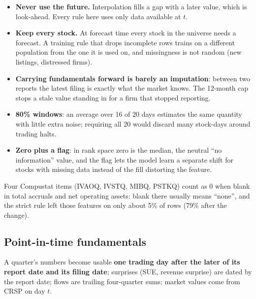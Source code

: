 \begin{whybox}
\begin{itemize}
\item \textbf{Never use the future.} Interpolation fills a gap with a later value, which is look-ahead.
  Every rule here uses only data available at $t$.
\item \textbf{Keep every stock.} At forecast time every stock in the universe needs a forecast. A training rule
  that drops incomplete rows trains on a different population from the one it is used on, and missingness
  is not random (new listings, distressed firms).
\item \textbf{Carrying fundamentals forward is barely an imputation}: between two reports the latest filing is
  exactly what the market knows. The 12-month cap stops a stale value standing in for a firm that stopped
  reporting.
\item \textbf{80\% windows}: an average over 16 of 20 days estimates the same quantity with little extra noise;
  requiring all 20 would discard many stock-days around trading halts.
\item \textbf{Zero plus a flag}: in rank space zero is the median, the neutral ``no information'' value, and
  the flag lets the model learn a separate shift for stocks with missing data instead of the fill
  distorting the feature.
\end{itemize}
Four Compustat items (IVAOQ, IVSTQ, MIBQ, PSTKQ) count as 0 when blank in total accruals and net operating
assets: blank there usually means ``none'', and the strict rule left those features on only about 5\% of
rows (79\% after the change).
\end{whybox}

\subsection{Point-in-time fundamentals}

 A quarter's numbers become usable \textbf{one trading day after the later of its
report date and its filing date}; surprises (SUE, revenue surprise) are dated by the report date; flows are
trailing four-quarter sums; market values come from CRSP on day $t$.

